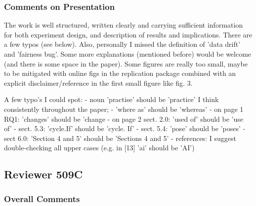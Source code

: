 \documentclass[conference,review,anonymous]{IEEEtran}
\begin{document}
\subsubsection{Comments on Presentation}

The work is well structured, written clearly and carrying sufficient
information for both experiment design, and description of results and
implications. There are a few typos (see below). Also, personally
I missed the definition of 'data drift' and 'fairness bug'. Some more
explanations (mentioned before) would be welcome (and there is some
space in the paper). Some figures are really too small, maybe to be
mitigated with online figs in the replication package combined with an
explicit disclaimer/reference in the first small figure like fig. 3.

A few typo's I could spot:
- noun 'practise' should be 'practice' I think consistently throughout
the paper; - 'where as' should be 'whereas'
- on page 1 RQ1: 'changes' should be 'change
- on page 2 sect. 2.0: 'used of' should be 'use of'
- sect. 5.3: 'cycle.If' should be 'cycle. If'
- sect. 5.4: 'pose' should be 'poses'
- sect 6.0: 'Section 4 and 5' should be 'Sections 4 and 5'
- references: I suggest double-checking all upper cases (e.g. in [13]
'ai' should be 'AI')

\subsection{Reviewer 509C}

\subsubsection{Overall Comments}
\end{document}
